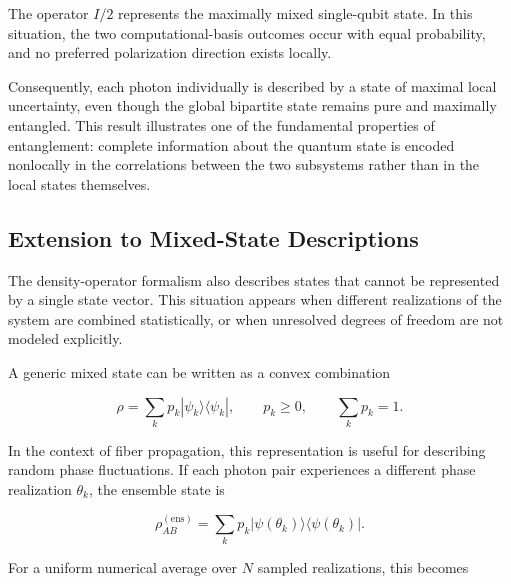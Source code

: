 The operator \( I/2 \) represents the maximally mixed single-qubit state. In this situation, the two computational-basis outcomes occur with equal probability, and no preferred polarization direction exists locally. 

\medskip 

Consequently, each photon individually is described by a state of maximal local uncertainty, even though the global bipartite state remains pure and maximally entangled. This result illustrates one of the fundamental properties of entanglement: complete information about the quantum state is encoded nonlocally in the correlations between the two subsystems rather than in the local states themselves.


\subsection{Extension to Mixed-State Descriptions}
\label{subsec:mixed_state_descriptions}

The density-operator formalism also describes states that cannot be represented by a single state vector. This situation appears when different realizations of the system are combined statistically, or when unresolved degrees of freedom are not modeled explicitly.

\medskip

A generic mixed state can be written as a convex combination

\begin{equation}
\rho
=
\sum_k p_k
|\psi_k\rangle\langle\psi_k|,
\qquad
p_k \geq 0,
\qquad
\sum_k p_k = 1.
\label{eq:mixed_state_convex_decomposition}
\end{equation}

In the context of fiber propagation, this representation is useful for describing random phase fluctuations. If each photon pair experiences a different phase realization \( \theta_k \), the ensemble state is

\begin{equation}
\rho_{AB}^{(\mathrm{ens})}
=
\sum_k p_k
|\psi(\theta_k)\rangle
\langle \psi(\theta_k)|.
\label{eq:mixed_state_ensemble_probabilities}
\end{equation}

For a uniform numerical average over \( N \) sampled realizations, this becomes

